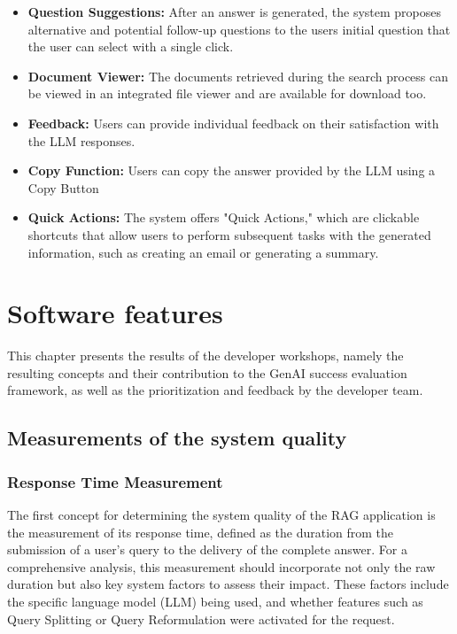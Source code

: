 \documentclass[
	english,
	ruledheaders=section,%
	class=report,%
	thesis={type=bachelor},%
	accentcolor=1b,%
	custommargins=true,%
	marginpar=false,%
	parskip=half-,%
	fontsize=11pt,%
	DIV=14,
]{tudapub}
\begin{document}
\begin{itemize}
    \item \textbf{Question Suggestions:} After an answer is generated, the system proposes alternative and potential follow-up questions to the users initial question that the user can select with a single click.
    
    \item \textbf{Document Viewer:} The documents retrieved during the search process can be viewed in an integrated file viewer and are available for download too.
    
    \item \textbf{Feedback:} Users can provide individual feedback on their satisfaction with the LLM responses.

    \item \textbf{Copy Function:} Users can copy the answer provided by the LLM using a Copy Button
    
    \item \textbf{Quick Actions:} The system offers "Quick Actions," which are clickable shortcuts that allow users to perform subsequent tasks with the generated information, such as creating an email or generating a summary.
\end{itemize}
\section{Software features}
This chapter presents the results of the developer workshops, namely the resulting concepts and their contribution to the GenAI success evaluation framework, as well as the prioritization and feedback by the developer team.
\subsection{Measurements of the system quality}
\subsubsection{Response Time Measurement}
The first concept for determining the system quality of the RAG application is the measurement of its response time, defined as the duration from the submission of a user's query to the delivery of the complete answer. For a comprehensive analysis, this measurement should incorporate not only the raw duration but also key system factors to assess their impact. These factors include the specific language model (LLM) being used, and whether features such as Query Splitting or Query Reformulation were activated for the request.
\end{document}
